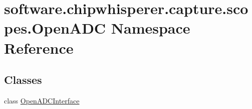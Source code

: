 \hypertarget{namespacesoftware_1_1chipwhisperer_1_1capture_1_1scopes_1_1OpenADC}{}\section{software.\+chipwhisperer.\+capture.\+scopes.\+Open\+A\+D\+C Namespace Reference}
\label{namespacesoftware_1_1chipwhisperer_1_1capture_1_1scopes_1_1OpenADC}
\subsection*{Classes}
\begin{DoxyCompactItemize}
\item 
class \hyperlink{classsoftware_1_1chipwhisperer_1_1capture_1_1scopes_1_1OpenADC_1_1OpenADCInterface}{Open\+A\+D\+C\+Interface}
\end{DoxyCompactItemize}
